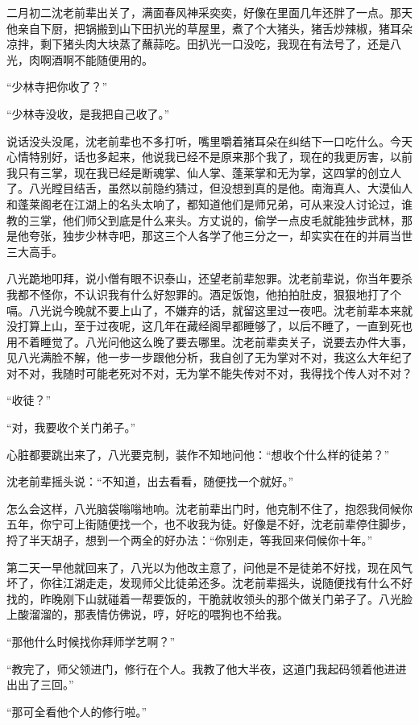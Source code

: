 二月初二沈老前辈出关了，满面春风神采奕奕，好像在里面几年还胖了一点。那天他亲自下厨，把锅搬到山下田扒光的草屋里，煮了个大猪头，猪舌炒辣椒，猪耳朵凉拌，剩下猪头肉大块蒸了蘸蒜吃。田扒光一口没吃，我现在有法号了，还是八光，肉啊酒啊不能随便用的。

“少林寺把你收了？”

“少林寺没收，是我把自己收了。”

说话没头没尾，沈老前辈也不多打听，嘴里嚼着猪耳朵在纠结下一口吃什么。今天心情特别好，话也多起来，他说我已经不是原来那个我了，现在的我更厉害，以前我只有三掌，现在我已经是断魂掌、仙人掌、蓬莱掌和无为掌，这四掌的创立人了。八光瞠目结舌，虽然以前隐约猜过，但没想到真的是他。南海真人、大漠仙人和蓬莱阁老在江湖上的名头太响了，都知道他们是师兄弟，可从来没人讨论过，谁教的三掌，他们师父到底是什么来头。方丈说的，偷学一点皮毛就能独步武林，那是他夸张，独步少林寺吧，那这三个人各学了他三分之一，却实实在在的并肩当世三大高手。

八光跪地叩拜，说小僧有眼不识泰山，还望老前辈恕罪。沈老前辈说，你当年要杀我都不怪你，不认识我有什么好恕罪的。酒足饭饱，他拍拍肚皮，狠狠地打了个嗝。八光说今晚就不要上山了，不嫌弃的话，就留这里过一夜吧。沈老前辈本来就没打算上山，至于过夜呢，这几年在藏经阁早都睡够了，以后不睡了，一直到死也用不着睡觉了。八光问他这么晚了要去哪里。沈老前辈卖关子，说要去办件大事，见八光满脸不解，他一步一步跟他分析，我自创了无为掌对不对，我这么大年纪了对不对，我随时可能老死对不对，无为掌不能失传对不对，我得找个传人对不对？

“收徒？”

“对，我要收个关门弟子。”

心脏都要跳出来了，八光要克制，装作不知地问他：“想收个什么样的徒弟？”

沈老前辈摇头说：“不知道，出去看看，随便找一个就好。”

怎么会这样，八光脑袋嗡嗡地响。沈老前辈出门时，他克制不住了，抱怨我伺候你五年，你宁可上街随便找一个，也不收我为徒。好像是不好，沈老前辈停住脚步，捋了半天胡子，想到一个两全的好办法：“你别走，等我回来伺候你十年。”

第二天一早他就回来了，八光以为他改主意了，问他是不是徒弟不好找，现在风气坏了，你往江湖走走，发现师父比徒弟还多。沈老前辈摇头，说随便找有什么不好找的，昨晚刚下山就碰着一帮要饭的，干脆就收领头的那个做关门弟子了。八光脸上酸溜溜的，那表情仿佛说，哼，好吃的喂狗也不给我。

“那他什么时候找你拜师学艺啊？”

“教完了，师父领进门，修行在个人。我教了他大半夜，这道门我起码领着他进进出出了三回。”

“那可全看他个人的修行啦。”

